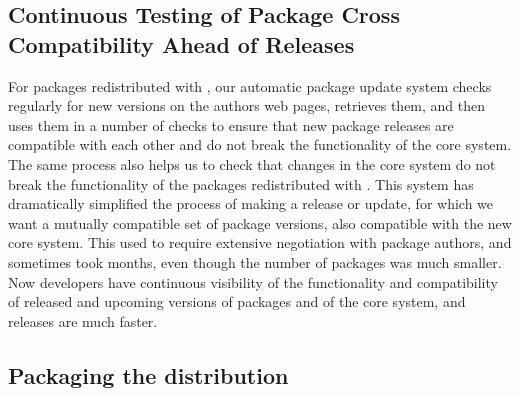 



\subsection{Continuous Testing of Package Cross Compatibility Ahead of
\GAP Releases}\label{pkg-update}
For packages redistributed with \GAP, our automatic package update system
checks regularly for new versions on the authors web pages, retrieves them, and then uses them in a
number of checks to ensure that new package releases are compatible with
each other and do not break the functionality of the core \GAP system. The
same process also helps us to check that changes in the core \GAP system
do not break the functionality of the packages redistributed with \GAP.
This system has dramatically simplified the process of making a \GAP
release or update, for which we want a mutually compatible set of
package versions, also compatible with the new core system. This used
to require extensive negotiation with package authors, and sometimes
took months, even though the number of packages was much smaller. Now
developers have continuous visibility of the functionality and
compatibility of released and upcoming versions of packages and of the
core system, and releases are much faster.


\subsection{Packaging the \GAP distribution}\label{distro}

